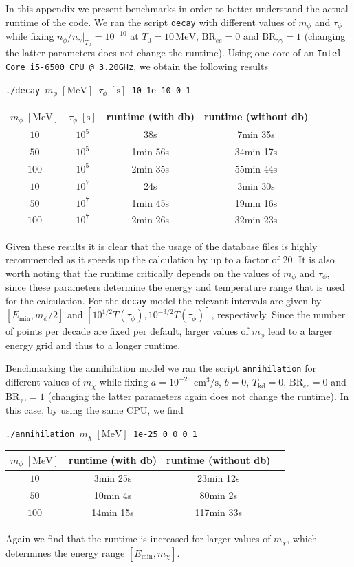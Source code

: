 \documentclass[11pt,a4paper]{article}
\begin{document}
In this appendix we present benchmarks in order to better understand the actual runtime of the code. We ran the script \texttt{decay} with different values of $m_\phi$ and $\tau_\phi$ while fixing $n_\phi/n_\gamma|_{T_0} = 10^{-10}$ at $T_0=10\,\mathrm{MeV}$, $\text{BR}_{ee} = 0$ and $\text{BR}_{\gamma\gamma}=1$ (changing the latter parameters does not change the runtime). Using one core of an \texttt{Intel Core i5-6500 CPU @ 3.20GHz}, we obtain the following results
\begin{center}
	\texttt{./decay $m_\phi\;\mathrm{[MeV]}$  $\tau_\phi\;\mathrm{[s]}$ 10 1e-10 0 1}
	\begin{tabular}{|c|c|c|c|}
		\hline
		$m_\phi\;\mathrm{[MeV]}$ & $\tau_\phi\;\mathrm{[s]}$ &  runtime (with db) & runtime (without db) \\
		\hline\hline
		$10$ & $10^5$ & 38s & 7min 35s\\
		\hline
		$50$ & $10^5$ & 1min 56s & 34min 17s \\
		\hline
		$100$ & $10^5$ & 2min 35s & 55min 44s \\
		\hline\hline
		$10$ & $10^7$ & 24s & 3min 30s\\
		\hline
		$50$ & $10^7$ & 1min 45s & 19min 16s\\
		\hline
		$100$ & $10^7$ & 2min 26s & 32min 23s\\
		\hline
	\end{tabular}
\end{center}
Given these results it is clear that the usage of the database files is highly recommended as it speeds up the calculation by up to a factor of 20. It is also worth noting that the runtime critically depends on the values of $m_\phi$ and $\tau_\phi$, since these parameters determine the energy and temperature range that is used for the calculation. For the \texttt{decay} model the relevant intervals are given by $[E_\text{min}, m_\phi/2]$ and $[10^{1/2}T(\tau_\phi), 10^{-3/2}T(\tau_\phi)]$, respectively. Since the number of points per decade are fixed per default, larger values of $m_\phi$ lead to a larger energy grid and thus to a longer runtime.

Benchmarking the annihilation model we ran the script \texttt{annihilation} for different values of $m_\chi$ while fixing $a=10^{-25}\;\mathrm{cm^3/s}$, $b=0$, $T_\text{kd} = 0$, $\text{BR}_{ee} = 0$ and $\text{BR}_{\gamma\gamma}=1$ (changing the latter parameters again does not change the runtime). In this case, by using the same CPU, we find
\begin{center}
	\texttt{./annihilation $m_\chi\;\mathrm{[MeV]}$ 1e-25 0 0 0 1}
	\begin{tabular}{|c|c|c|c|}
		\hline
		$m_\phi\;\mathrm{[MeV]}$ &  runtime (with db) & runtime (without db) \\
		\hline\hline
		$10$ & 3min 25s & 23min 12s\\
		\hline
		$50$ & 10min 4s & 80min 2s \\
		\hline
		$100$ & 14min 15s & 117min 33s \\
		\hline
	\end{tabular}
\end{center}
Again we find that the runtime is increased for larger values of $m_\chi$, which determines the energy range $[E_\text{min}, m_\chi]$.
\end{document}
